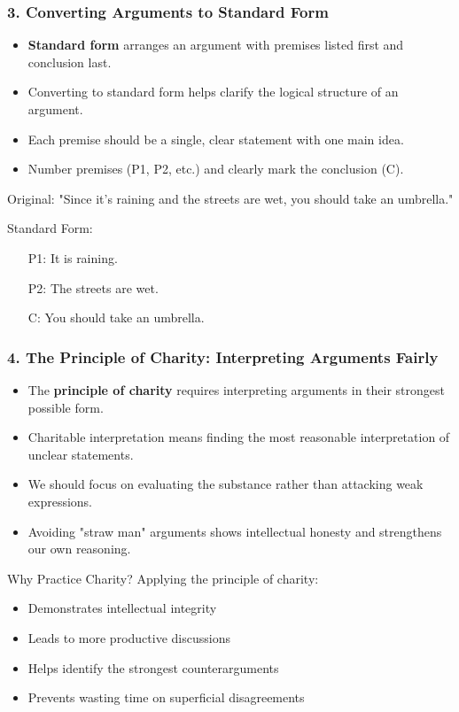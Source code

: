 \documentclass{beamer}
\begin{document}
\begin{frame}
\frametitle{3. Converting Arguments to Standard Form}
\begin{itemize}
\item \textbf{Standard form} arranges an argument with premises listed first and conclusion last.
\item Converting to standard form helps clarify the logical structure of an argument.
\item Each premise should be a single, clear statement with one main idea.
\item Number premises (P1, P2, etc.) and clearly mark the conclusion (C).
\end{itemize}

\begin{example}
Original: "Since it's raining and the streets are wet, you should take an umbrella."

Standard Form:
\begin{enumerate}
\item[P1:] It is raining.
\item[P2:] The streets are wet.
\item[C:] You should take an umbrella.
\end{enumerate}

\end{example}
\end{frame}

\begin{frame}
\frametitle{4. The Principle of Charity: Interpreting Arguments Fairly}
\begin{itemize}
\item The \textbf{principle of charity} requires interpreting arguments in their strongest possible form.
\item Charitable interpretation means finding the most reasonable interpretation of unclear statements.
\item We should focus on evaluating the substance rather than attacking weak expressions.
\item Avoiding "straw man" arguments shows intellectual honesty and strengthens our own reasoning.
\end{itemize}

\begin{alertblock}{Why Practice Charity?}
Applying the principle of charity:
\begin{itemize}
\item Demonstrates intellectual integrity
\item Leads to more productive discussions
\item Helps identify the strongest counterarguments
\item Prevents wasting time on superficial disagreements
\end{itemize}
\end{alertblock}
\end{frame}
\end{document}
